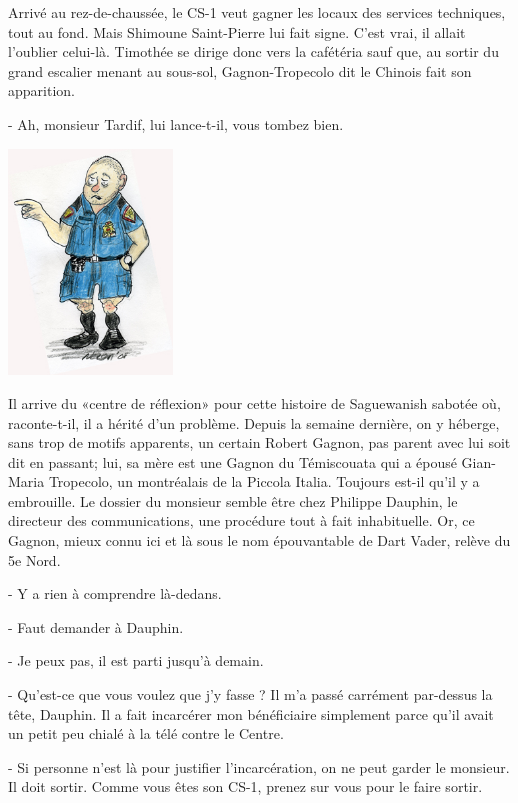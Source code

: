 Arrivé au rez-de-chaussée, le CS-1 veut gagner les locaux des services techniques, tout au fond. Mais Shimoune Saint-Pierre lui fait signe. C’est vrai, il allait l’oublier celui-là. Timothée se dirige donc vers la cafétéria sauf que, au sortir du grand escalier menant au sous-sol, Gagnon-Tropecolo dit le Chinois fait son apparition.

- Ah, monsieur Tardif, lui lance-t-il, vous tombez bien.

\begin{floatingfigure}[l]{40mm}
\includegraphics[height=60mm]{corps/chapitre11/img/personnage-tropecolo.jpg}
\end{floatingfigure}

Il arrive du «centre de réflexion» pour cette histoire de Saguewanish sabotée où, raconte-t-il, il a hérité d’un problème. Depuis la semaine dernière, on y héberge, sans trop de motifs apparents, un certain Robert Gagnon, pas parent avec lui soit dit en passant; lui, sa mère est une Gagnon du Témiscouata qui a épousé Gian-Maria Tropecolo, un montréalais de la Piccola Italia. Toujours est-il qu’il y a embrouille. Le dossier du monsieur semble être chez Philippe Dauphin, le directeur des communications, une procédure tout à fait inhabituelle. Or, ce Gagnon, mieux connu ici et là sous le nom épouvantable de Dart Vader, relève du 5e Nord.

- Y a rien à comprendre là-dedans.

- Faut demander à Dauphin.

- Je peux pas, il est parti jusqu’à demain.

- Qu’est-ce que vous voulez que j’y fasse ? Il m’a passé carrément par-dessus la tête, Dauphin. Il a fait incarcérer mon bénéficiaire simplement parce qu’il avait un petit peu chialé à la télé contre le Centre.

- Si personne n’est là pour justifier l’incarcération, on ne peut garder le monsieur. Il doit sortir. Comme vous êtes son CS-1, prenez sur vous pour le faire sortir.

